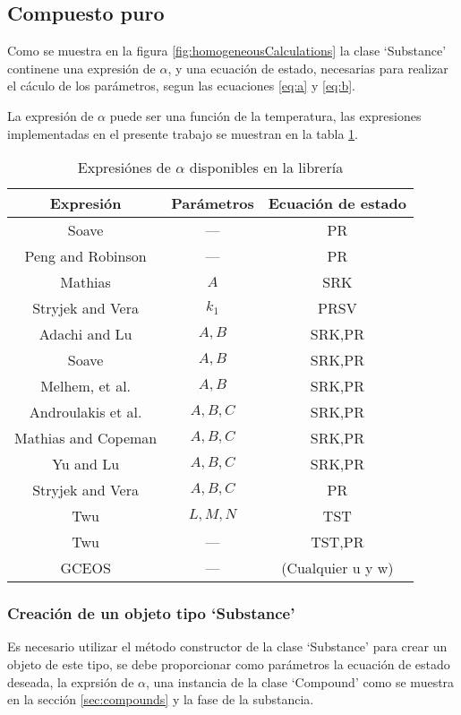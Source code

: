 \subsection{Compuesto puro}\label{subsec:substance}

Como se muestra en la figura \ref{fig:homogeneousCalculations} la clase `Substance' continene una expresión de $\alpha$, y una ecuación de estado, necesarias para realizar el cáculo de los parámetros, segun las ecuaciones \ref{eq:a} y \ref{eq:b}. 

La expresión de $\alpha$ puede ser una función de la temperatura, las expresiones implementadas en el presente trabajo se muestran en la tabla \ref{tab:alphas}.

\begin{table}[!h]
	\centering
	\caption{Expresiónes de $\alpha$ disponibles en la librería}\label{tab:alphas}
	\begin{tabular}{|c|c|c| }
		\hline
		Expresión & Parámetros & Ecuación de estado\\
		\hline
		Soave    &  ---& PR\\
		Peng and Robinson & ---& PR \\
		Mathias & $A$ & SRK\\
		Stryjek and Vera & $k_1$ & PRSV\\
		Adachi and Lu & $A,B$&SRK,PR\\
		Soave & $A,B$&SRK,PR\\
		Melhem, et al. & $A,B$&SRK,PR\\
		Androulakis et al. & $A,B,C$& SRK,PR\\
		Mathias and Copeman & $A,B,C$& SRK,PR\\
		Yu and Lu & $A,B,C$&SRK,PR\\
		Stryjek and Vera & $A,B,C$&PR\\
		Twu & $L,M,N$&TST\\
		Twu & ---&TST,PR\\
		GCEOS & ---& (Cualquier u y w)\\
		\hline
	\end{tabular}
\end{table}
\subsubsection{Creación de un objeto tipo `Substance'}\label{subsub:substanceCreation}

Es necesario utilizar el método constructor de la clase `Substance' para crear un objeto de este tipo, se debe proporcionar como parámetros la ecuación de estado deseada, la exprsión de $\alpha$, una instancia de la clase `Compound' como se muestra en la sección \ref{sec:compounds} y la fase de la substancia.

